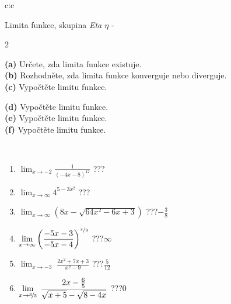\documentclass[10pt]{report}
\begin{document}
\begin{tabular}{c:c}
\begin{minipage}[c][104.5mm][t]{0.5\linewidth}
\begin{center}
\vspace{7mm}
{\huge Limita funkce, skupina \textit{Eta $\eta$} -}\\[5mm]
\begin{minipage}{0.95\linewidth}
\begin{center}
{\small \begin{multicols}{2} \raggedright
\textbf{(a)} Určete, zda limita funkce existuje. \\[1mm]
\textbf{(b)} Rozhodněte, zda limita funkce konverguje nebo diverguje. \\[1mm]
\textbf{(c)} Vypočtěte limitu funkce. \par \columnbreak
\textbf{(d)} Vypočtěte limitu funkce. \\[1mm]
\textbf{(e)} Vypočtěte limitu funkce. \\[1mm]
\textbf{(f)} Vypočtěte limitu funkce. \\[1mm]
\end{multicols}
}
\end{center}
\end{minipage}
\\[4mm]
\begin{minipage}{0.79\linewidth}
\begin{center}
\begin{varwidth}{\linewidth}
\begin{enumerate}
\normalsize
\item $\displaystyle\lim_{x\to-2}{\frac{1}{(-4x-8)^{12}}}$\quad \dotfill\; ???\;\dotfill \quad {}
\item $\displaystyle\lim_{x\to\infty}{4^{5-3x^2}}$\quad \dotfill\; ???\;\dotfill \quad {}
\item $\displaystyle\lim_{x\to\infty}{\left(8x - \sqrt{64x^2-6x+3}\right)}$\quad \dotfill\; ???\;\dotfill \quad $-\frac{3}{8}$
\item $\displaystyle\lim_{x\to\infty}{\left( \frac{-5x-3}{-5x-4} \right)^{\nicefrac{x}{9}}}$\quad \dotfill\; ???\;\dotfill \quad $\infty$
\item $\displaystyle\lim_{x\to -3}{\;\frac{2x^2+7x+3}{x^2-9}}$\quad \dotfill\; ???\;\dotfill \quad $\frac{5}{12}$
\item $\displaystyle\lim_{x\to \nicefrac{3}{5}}{\;\frac{2x-\frac{6}{5}}{\sqrt{x+5} - \sqrt{8-4x}}}$\quad \dotfill\; ???\;\dotfill \quad $0$

\end{enumerate}
\end{varwidth}
\end{center}
\end{minipage}
\end{center}
\end{minipage}
\end{tabular}
\end{document}
